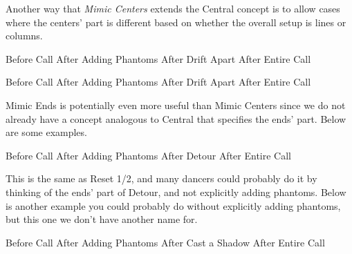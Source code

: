 \documentclass[12pt]{article}
\begin{document}
Another way that \emph{Mimic Centers} extends the Central concept
is to allow cases where the centers' part is different based on
whether the overall setup is lines or columns.

\displayfour
{\cr
 }
{Before Call}
{\cr
 }
{After Adding Phantoms}
{\cr
 }
{After Drift Apart}
{\cr
 }
{After Entire Call}
\endexample

\displayfour
{\cr
 }
{Before Call}
{\cr
 \cr
 \cr
 }
{After Adding Phantoms}
{\cr
 \cr
 \cr
 }
{After Drift Apart}
{\cr
 }
{After Entire Call}
\endexample

Mimic Ends is potentially even more useful than Mimic Centers since
we do not already have a concept analogous to Central that specifies the
ends' part.  Below are some examples.

\displayfour
{\cr
 }
{Before Call}
{\cr
 }
{After Adding Phantoms}
{\cr
 }
{After Detour}
{\cr
 }
{After Entire Call}
\endexample

This is the same as Reset 1/2, and many dancers could probably do it
by thinking of the ends' part of Detour, and not explicitly adding phantoms.
Below is another example you could probably do without explicitly adding
phantoms, but this one we don't have another name for.

\displayfour
{\cr
 }
{Before Call}
{\cr
 }
{After Adding Phantoms}
{\cr
 \cr
 \cr
 }
{After Cast a Shadow}
{\cr
 }
{After Entire Call}
\endexample
\end{document}
